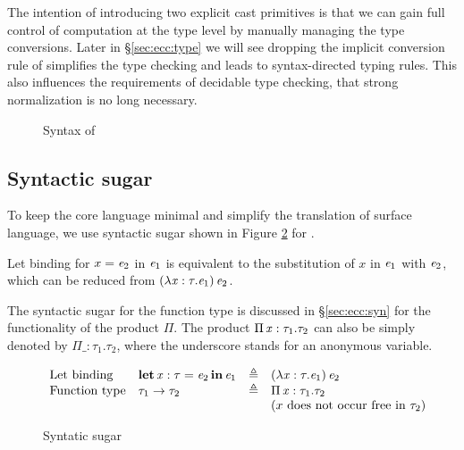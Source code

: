 The intention of introducing two explicit cast primitives is that we can gain full control of computation at the type level by manually managing the type conversions. Later in \S \ref{sec:ecc:type} we will see dropping the implicit conversion rule of \cc simplifies the type checking and leads to syntax-directed typing rules. This also influences the requirements of decidable type checking, that strong normalization is no long necessary.

\begin{figure}[ht]
	\gram{\otte\ottinterrule
		\otts\ottinterrule
		\ottG\ottinterrule
		\ottv}
	\caption{Syntax of \expcc}
	\label{fig:ecc:syntax}
\end{figure}

\subsection{Syntactic sugar}

To keep the core language minimal and simplify the translation of surface language, we use syntactic sugar shown in Figure \ref{fig:ecc:sugar} for \expcc.

Let binding for $x=\mathit{e_{{\mathrm{2}}}}$ in $\mathit{e_{{\mathrm{1}}}}$ is equivalent to the substitution of $x$ in $\mathit{e_{{\mathrm{1}}}}$ with $\mathit{e_{{\mathrm{2}}}}$, which can be reduced from $(  \lambda  \mathit{x}  :  \tau  .  \mathit{e_{{\mathrm{1}}}}  ) \, \mathit{e_{{\mathrm{2}}}}$.

The syntactic sugar for the function type is discussed in \S \ref{sec:ecc:syn} for the functionality of the product $ \Pi $. The product $\Pi \, \mathit{x}  :  \tau_{{\mathrm{1}}}  .  \tau_{{\mathrm{2}}}$ can also be simply denoted by $ \Pi  \_ : \tau_{{\mathrm{1}}} . \tau_{{\mathrm{2}}}$, where the underscore stands for an anonymous variable.

\begin{figure}[ht]
	\centering
	\[
	\begin{array}{llll}
	\text{Let binding} & \mathbf{let} \, \mathit{x}  :  \tau  =  \mathit{e_{{\mathrm{2}}}} \, \mathbf{in} \, \mathit{e_{{\mathrm{1}}}} & \triangleq & (  \lambda  \mathit{x}  :  \tau  .  \mathit{e_{{\mathrm{1}}}}  ) \, \mathit{e_{{\mathrm{2}}}} \\
	\text{Function type} & \tau_{{\mathrm{1}}}  \rightarrow  \tau_{{\mathrm{2}}} & \triangleq & \Pi \, \mathit{x}  :  \tau_{{\mathrm{1}}}  .  \tau_{{\mathrm{2}}}\\
	&&& \text{($x$ does not occur free in $\tau_{{\mathrm{2}}}$)}
	\end{array}
	\]
	\caption{Syntatic sugar}
	\label{fig:ecc:sugar}
\end{figure}

